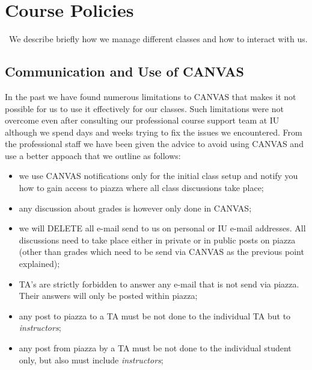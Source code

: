 
\chapter{Course Policies}\label{C:course-2018}

\FILENAME
\
We describe briefly how we manage different classes and how to
interact with us. 

\section{Communication and Use of CANVAS}

In the past we have found numerous limitations to CANVAS that makes it
not possible for us to use it effectively for our classes. Such
limitations were not overcome even after consulting our professional
course support team at IU although we spend days and weeks trying to
fix the issues we encountered. From the professional staff we have
been given the advice to avoid using CANVAS and use a better appoach
that we outline as follows:

\begin{itemize}

\item we use CANVAS notifications only for the initial class setup and
  notify you how to gain access to piazza where all class discussions
  take place;

\item any discussion about grades is however only done in CANVAS;

\item we will DELETE all e-mail send to us on personal or IU e-mail
  addresses. All discussions need to take place either in private or
  in public posts on piazza (other than grades which need to be send
  via CANVAS as the previous point explained);

\item TA's are strictly forbidden to answer any e-mail that is not send
  via piazza. Their answers will only be posted within piazza;

\item any post to piazza to a TA must be not done to the individual TA
  but to {\em instructors};

\item any post from piazza by a TA must be not done to the individual
  student only, but also must include {\em instructors};

\end{itemize}

